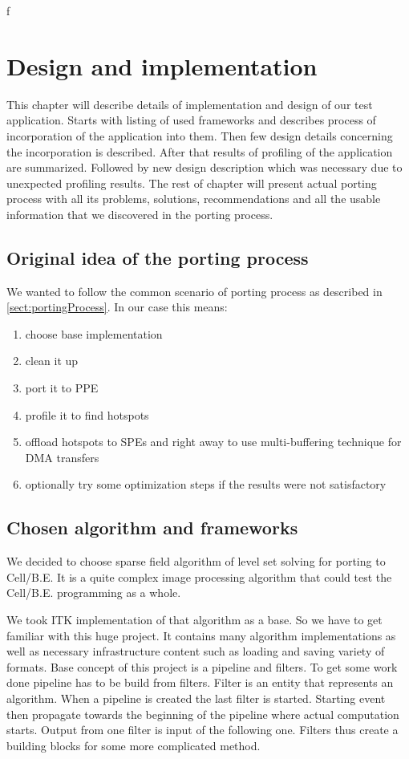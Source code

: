 f\chapter{Design and implementation}

This chapter will describe details of implementation and design of our test application.
Starts with listing of used frameworks and describes process of incorporation of the application into them.
Then few design details concerning the incorporation is described.
After that results of profiling of the application are summarized.
Followed by new design description which was necessary due to unexpected profiling results.
The rest of chapter will present actual porting process with all its problems, solutions, recommendations and all the usable information that we discovered in the porting process.

\section{Original idea of the porting process}

We wanted to follow the common scenario of porting process as described in \ref{sect:portingProcess}.
In our case this means:
\begin{enumerate}
\item{choose base implementation}
\item{clean it up}
\item{port it to PPE}
\item{profile it to find hotspots}
\item{offload hotspots to SPEs and right away to use multi-buffering technique for DMA transfers}
\item{optionally try some optimization steps if the results were not satisfactory}
\end{enumerate}

\section{Chosen algorithm and frameworks}

\par
We decided to choose sparse field algorithm of level set solving for porting to \mbox{Cell/B.E.}
It is a quite complex image processing algorithm that could test the \mbox{Cell/B.E.} programming as a whole.

\par
We took ITK \cite{itk} implementation of that algorithm as a base.
So we have to get familiar with this huge project.
It contains many algorithm implementations as well as necessary infrastructure content such as loading and saving variety of formats.
Base concept of this project is a pipeline and filters.
To get some work done pipeline has to be build from filters.
Filter is an entity that represents an algorithm.
When a pipeline is created the last filter is started.
Starting event then propagate towards the beginning of the pipeline where actual computation starts.
Output from one filter is input of the following one.
Filters thus create a building blocks for some more complicated method.

